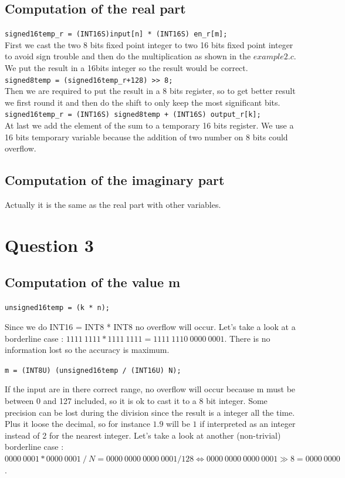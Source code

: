 \documentclass[a4paper]{article}
\begin{document}
\subsection{Computation of the real part}

\verb|signed16temp_r = (INT16S)input[n] * (INT16S) en_r[m];|
\\
First we cast the two 8 bits fixed point integer to two 16 bits fixed point integer to avoid sign trouble and then do the multiplication as shown in the $example2.c$. We put the result in a 16bits integer so the result would be correct.
\\
\verb|signed8temp = (signed16temp_r+128) >> 8;|
\\
Then we are required to put the result in a 8 bits register, so to get better result we first round it and then do the shift to only keep the most significant bits.
\\
\verb|signed16temp_r = (INT16S) signed8temp + (INT16S) output_r[k];|
\\
At last we add the element of the sum to a temporary 16 bits register. We use a 16 bits temporary variable because the addition of two number on 8 bits could overflow.

\subsection{Computation of the imaginary part}

Actually it is the same as the real part with other variables.

\section{Question 3}

\subsection{Computation of the value m}

\verb|unsigned16temp = (k * n);|

Since we do INT16 = INT8 * INT8 no overflow will occur. Let's take a look at a borderline case :   $ 1111\ 1111 * 1111\ 1111 = 1111\ 1110\ 0000\ 0001 $. There is no information lost so the accuracy is maximum.

\verb|m = (INT8U) (unsigned16temp / (INT16U) N);|

If the input are in there correct range, no overflow will occur because m must be between 0 and 127 included, so it is ok to cast it to a 8 bit integer. Some precision can be lost during the division since the result is a integer all the time. Plus it loose the decimal, so for instance $1.9$ will be $1$ if interpreted as an integer instead of 2 for the nearest integer. Let's take a look at another (non-trivial) borderline case :   $ 0000\ 0001 * 0000\ 0001\ /\ N = 0000\ 0000\ 0000\ 0001 / 128 \Leftrightarrow 0000\ 0000\ 0000\ 0001 \gg 8 = 0000\ 0000 $.
\end{document}
